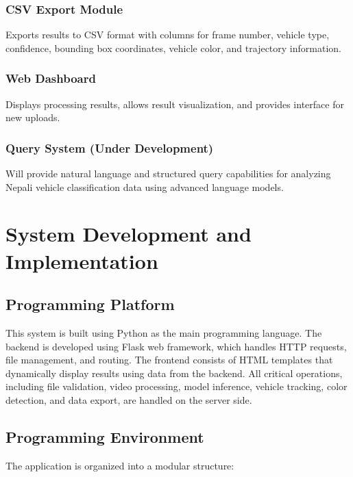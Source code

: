 \documentclass[12pt,a4paper]{report}
\begin{document}
\subsection{CSV Export Module}
Exports results to CSV format with columns for frame number, vehicle type, confidence, bounding box coordinates, vehicle color, and trajectory information.

\subsection{Web Dashboard}
Displays processing results, allows result visualization, and provides interface for new uploads.

\subsection{Query System (Under Development)}
Will provide natural language and structured query capabilities for analyzing Nepali vehicle classification data using advanced language models.



\chapter{System Development and Implementation}

\section{Programming Platform}
This system is built using Python as the main programming language. The backend is developed using Flask web framework, which handles HTTP requests, file management, and routing. The frontend consists of HTML templates that dynamically display results using data from the backend. All critical operations, including file validation, video processing, model inference, vehicle tracking, color detection, and data export, are handled on the server side.

\section{Programming Environment}
The application is organized into a modular structure:
\end{document}
